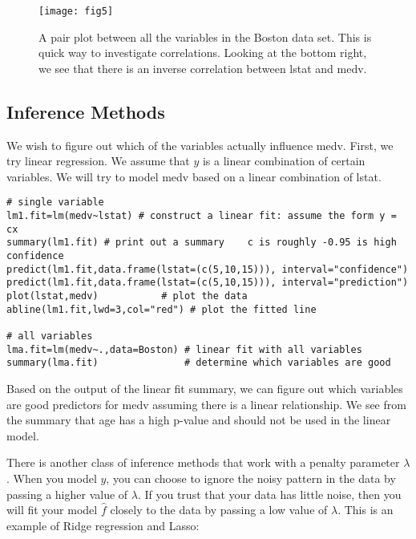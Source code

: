 \documentclass{article}
\begin{document}
\begin{figure}
\centering
\texttt{[image: fig5]}
\caption{A pair plot between all the variables in the Boston data set. This is quick way to investigate correlations. Looking at the bottom right, we see that there is an inverse correlation between lstat and medv.}
\end{figure}

\subsection{Inference Methods}
We wish to figure out which of the variables actually influence medv. First, we try linear regression. We assume that $y$ is a linear combination of certain variables. We will try to model medv based on a linear combination of lstat.
\begin{verbatim}
# single variable
lm1.fit=lm(medv~lstat) # construct a linear fit: assume the form y = cx
summary(lm1.fit) # print out a summary    c is roughly -0.95 is high confidence
predict(lm1.fit,data.frame(lstat=(c(5,10,15))), interval="confidence")
predict(lm1.fit,data.frame(lstat=(c(5,10,15))), interval="prediction")
plot(lstat,medv)           # plot the data
abline(lm1.fit,lwd=3,col="red") # plot the fitted line

# all variables
lma.fit=lm(medv~.,data=Boston) # linear fit with all variables
summary(lma.fit)               # determine which variables are good
\end{verbatim}
Based on the output of the linear fit summary, we can figure out which variables are good predictors for medv assuming there is a linear relationship. We see from the summary that age has a high p-value and should not be used in the linear model.

There is another class of inference methods that work with a penalty parameter $\lambda$. When you model $y$, you can choose to ignore the noisy pattern in the data by passing a higher value of $\lambda$. If you trust that your data has little noise, then you will fit your model $\hat{f}$ closely to the data by passing a low value of $\lambda$. This is an example of Ridge regression and Lasso:
\end{document}
